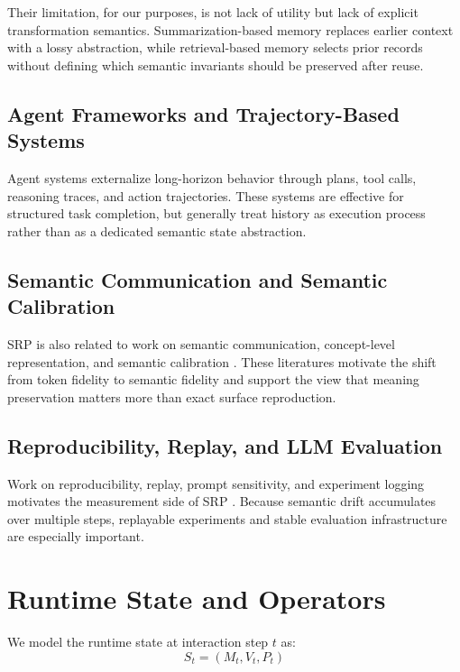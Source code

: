\documentclass{article}
\begin{document}
Their limitation, for our purposes, is not lack of utility but lack of explicit transformation semantics. Summarization-based memory replaces earlier context with a lossy abstraction, while retrieval-based memory selects prior records without defining which semantic invariants should be preserved after reuse.

\subsection{Agent Frameworks and Trajectory-Based Systems}
Agent systems externalize long-horizon behavior through plans, tool calls, reasoning traces, and action trajectories. These systems are effective for structured task completion, but generally treat history as execution process rather than as a dedicated semantic state abstraction.

\subsection{Semantic Communication and Semantic Calibration}
SRP is also related to work on semantic communication, concept-level representation, and semantic calibration \citep{guo2024semanticnetworks,survey2025semanticcommunications,survey2025securesemantic}. These literatures motivate the shift from token fidelity to semantic fidelity and support the view that meaning preservation matters more than exact surface reproduction.

\subsection{Reproducibility, Replay, and LLM Evaluation}
Work on reproducibility, replay, prompt sensitivity, and experiment logging motivates the measurement side of SRP \citep{promptsensitivity2023,benchmarkingpromptsensitivity2025,assessingreproducibility2025,reproducibilityml2024,towardstrainingreproducible2022,reproducibilitygeneralizability2024}. Because semantic drift accumulates over multiple steps, replayable experiments and stable evaluation infrastructure are especially important.

\section{Runtime State and Operators}
We model the runtime state at interaction step $t$ as:
\begin{equation}
S_t = (M_t, V_t, P_t)
\end{equation}
\end{document}
